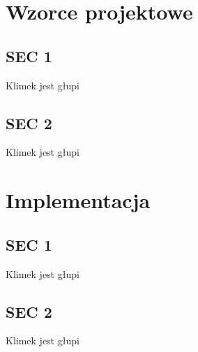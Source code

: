 \documentclass[pdflatex,11pt]{aghdpl}
\begin{document}

\chapter{Wzorce projektowe}

\section{SEC 1}

Klimek jest głupi


\section{SEC 2}

Klimek jest głupi


\chapter{Implementacja}

\section{SEC 1}

Klimek jest głupi


\section{SEC 2}

Klimek jest głupi
\end{document}
